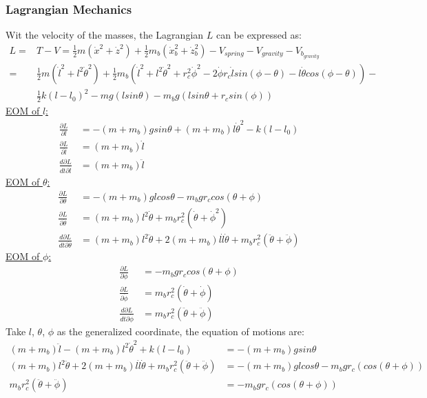 \subsubsection{Lagrangian Mechanics}
Wit the velocity of the masses, the Lagrangian $L$ can be expressed as:
\begin{align*}
L = & T-V = \frac{1}{2}m(\dot x^2+\dot z^2) + \frac{1}{2}m_b(\dot x_b^2+\dot z_b^2) - V_{spring} - V_{gravity}- V_{b_{gravity}}\\
 = &\frac{1}{2}m(\dot l^2 + l^2\dot \theta^2) +  
 \frac{1}{2}m_b(\dot l^2 + l^2\dot \theta^2 + r_c^2\dot\phi^2 - 2\dot{\phi}r_c\dot lsin(\phi-\theta) - l\dot \theta cos(\phi-\theta)) -\\ &\frac{1}{2}k(l-l_0)^2-mg(lsin\theta)-m_bg(lsin\theta + r_csin(\phi))
\end{align*}
\noindent \underline{EOM of $l$:}
\begin{align*}
\frac{\partial L}{\partial l} &= -(m+m_b)gsin\theta+(m+m_b)l\dot\theta^2 - k(l-l_0)\\
\frac{\partial L}{\partial \dot l} &= (m+m_b)\dot l\\
\frac{d\partial L}{dt\partial \dot l} &= (m+m_b)\ddot l
\end{align*}
\noindent \underline{EOM of $\theta$:}
\begin{align*}
\frac{\partial L}{\partial \theta} &= -(m+m_b)glcos\theta-m_bgr_ccos(\theta+\phi)\\
\frac{\partial L}{\partial \dot \theta} &= (m+m_b)l^2\dot{\theta} + m_br_c^2(\dot{\theta} + \dot{\phi}^2)\\
\frac{d\partial L}{dt\partial \dot \theta} &= (m+m_b)l^2\ddot{\theta} + 2(m+m_b)l\dot l\dot \theta + m_br_c^2(\ddot{\theta}+\ddot{\phi}) 
\end{align*}
\noindent \underline{EOM of $\phi$:}
\begin{align*}
\frac{\partial L}{\partial \phi} &=-m_bgr_ccos(\theta+\phi)\\
\frac{\partial L}{\partial \dot \phi} &= m_br_c^2(\dot{\theta} + \dot{\phi})\\
\frac{d\partial L}{dt\partial \dot \phi} &= m_br_c^2(\ddot{\theta}+\ddot{\phi}) 
\end{align*}
\noindent
Take $l$, $\theta$, $\phi$ as the generalized coordinate, the equation of motions are:
\begin{align*}
(m+m_b)\ddot{l} - (m+m_b)l^2\dot{\theta}^2 + k(l-l_0) &= -(m+m_b)gsin\theta\\
(m+m_b)l^2\ddot{\theta} + 2(m+m_b)l\dot l \dot{\theta} + m_br_c^2(\ddot\theta+\ddot\phi) &= -(m+m_b)glcos\theta - m_bgr_c(cos(\theta + \phi))\\
m_br_c^2(\ddot\theta+\ddot\phi) &= - m_bgr_c(cos(\theta + \phi))
\end{align*}
\noindent
\pagebreak